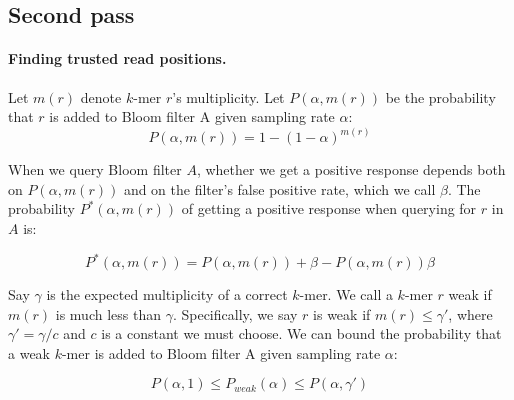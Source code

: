 \documentclass[10pt]{article}
\begin{document}



\subsection*{Second pass}

\paragraph{Finding trusted read positions.} Let $m(r)$ denote $k$-mer $r$'s multiplicity.  Let $P(\alpha, m(r))$ be the probability that $r$ is added to Bloom filter A given sampling rate $\alpha$:
$$P(\alpha, m(r)) = 1-(1-\alpha)^{m(r)}$$

When we query Bloom filter $A$, whether we get a positive response depends both on $P(\alpha, m(r))$ and on the filter's false positive rate, which we call $\beta$.  The probability $P^*(\alpha, m(r))$ of getting a positive response when querying for $r$ in $A$ is:

$$P^*(\alpha, m(r))=P(\alpha, m(r))+\beta-P(\alpha, m(r))\beta$$

Say $\gamma$ is the expected multiplicity of a correct $k$-mer.  We call a $k$-mer $r$ weak if $m(r)$ is much less than $\gamma$. Specifically, we say $r$ is weak if $m(r) \leq \gamma'$, where $\gamma'=\gamma/c$ and $c$ is a constant we must choose. We can bound the probability that a weak $k$-mer is added to Bloom filter A given sampling rate $\alpha$:

$$P(\alpha, 1) \leq P_{weak}(\alpha) \leq P(\alpha, \gamma')$$
\end{document}
